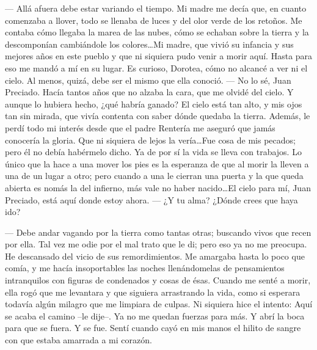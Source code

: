   --- Allá afuera debe estar variando el tiempo. Mi madre me decía que, en cuanto comenzaba a llover, todo se llenaba de luces y del olor verde de los retoños. Me contaba cómo llegaba la marea de las nubes, cómo se echaban sobre la tierra y la descomponían cambiándole los colores\ldots Mi madre, que vivió su infancia y sus mejores años en este pueblo y que ni siquiera pudo venir a morir aquí. Hasta para eso me mandó a mí en su lugar. Es curioso, Dorotea, cómo no alcancé a ver ni el cielo. Al menos, quizá, debe ser el mismo que ella conoció.
\pend
%
\pstart
  --- No lo sé, Juan Preciado. Hacía tantos años que no alzaba la cara, que me olvidé del cielo. Y aunque lo hubiera hecho, ¿qué habría ganado? El cielo está tan alto, y mis ojos tan sin mirada, que vivía contenta con saber dónde quedaba la tierra. Además, le perdí todo mi interés desde que el padre Rentería me aseguró que jamás conocería la gloria. Que ni siquiera de lejos la vería\ldots Fue cosa de mis pecados; pero él no debía habérmelo dicho. Ya de por sí la vida se lleva con trabajos. Lo único que la hace a una mover los pies es la esperanza de que al morir la lleven a una de un lugar a otro; pero cuando a una le cierran una puerta y la que queda abierta es nomás la del infierno, más vale no haber nacido\ldots El cielo para mí, Juan Preciado, está aquí donde estoy ahora.
\pend
%
\pstart
  --- ¿Y tu alma? ¿Dónde crees que haya ido?

  --- Debe andar vagando por la tierra como tantas otras; buscando vivos que recen por ella. Tal vez me odie por el mal trato que le di; pero eso ya no me preocupa. He descansado del vicio de sus remordimientos. Me amargaba hasta lo poco que comía, y me hacía insoportables las noches llenándomelas de pensamientos intranquilos con figuras de condenados y cosas de ésas. Cuando me senté a morir, ella rogó que me levantara y que siguiera arrastrando la vida, como si esperara todavía algún milagro que me limpiara de culpas. Ni siquiera hice el intento: \guillemotleft Aquí se acaba el camino --le dije--. Ya no me quedan fuerzas para más\guillemotright. Y abrí la boca para que se fuera. Y se fue. Sentí cuando cayó en mis manos el hilito de sangre con que estaba amarrada a mi corazón.
\pend

